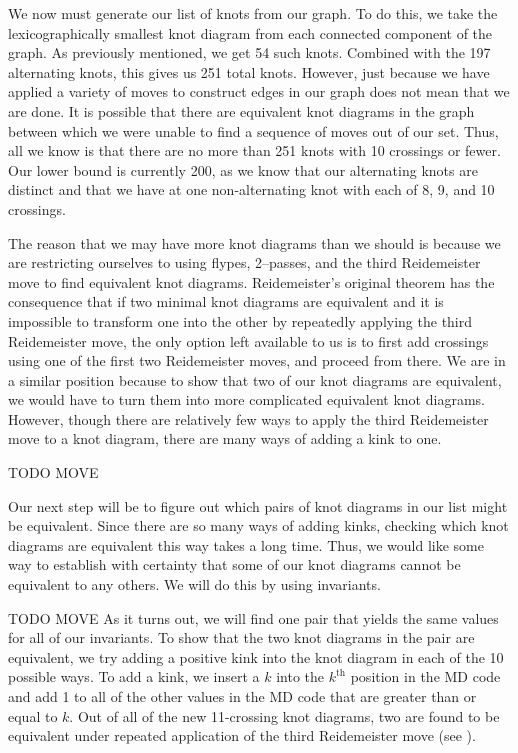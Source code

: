 \begin{paper}
We now must generate our list of knots from our graph.
To do this, we take the lexicographically smallest knot diagram from each
connected component of the graph.
As previously mentioned, we get 54 such knots.
Combined with the 197 alternating knots, this gives us 251 total knots.
However, just because we have applied a variety of moves to construct edges in
our graph does not mean that we are done.
It is possible that there are equivalent knot diagrams in the graph between
which we were unable to find a sequence of moves out of our set.
Thus, all we know is that there are no more than 251 knots with 10 crossings or
fewer.
Our lower bound is currently 200, as we know that our alternating knots are
distinct and that we have at one non-alternating knot with each of 8, 9, and 10
crossings.

The reason that we may have more knot diagrams than we should is because we are
restricting ourselves to using flypes, 2--passes, and the third Reidemeister
move to find equivalent knot diagrams.
Reidemeister's original theorem has the consequence that if two minimal knot
diagrams are equivalent and it is impossible to transform one into the other by
repeatedly applying the third Reidemeister move, the only option left available
to us is to first add crossings using one of the first two Reidemeister moves,
and proceed from there.
We are in a similar position because to show that two of our knot diagrams are
equivalent, we would have to turn them into more complicated equivalent knot
diagrams.
However, though there are relatively few ways to apply the third Reidemeister
move to a knot diagram, there are many ways of adding a kink to one.

TODO MOVE

Our next step will be to figure out which pairs of knot diagrams in our list
might be equivalent.
Since there are so many ways of adding kinks, checking which knot diagrams are
equivalent this way takes a long time.
Thus, we would like some way to establish with certainty that some of our knot
diagrams cannot be equivalent to any others.
We will do this by using invariants.

TODO MOVE
As it turns out, we will find one pair that yields the same values for all of
our invariants.
To show that the two knot diagrams in the pair are equivalent, we try adding a
positive kink into the knot diagram in each of the 10 possible ways.
To add a kink, we insert a $k$ into the $k^\text{th}$ position in the MD code
and add 1 to all of the other values in the MD code that are greater than or
equal to $k$.
Out of all of the new 11-crossing knot diagrams, two are found to be equivalent
under repeated application of the third Reidemeister move (see \figMoves).


\end{paper}
